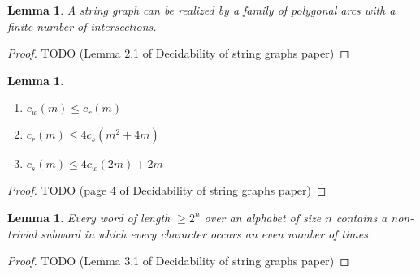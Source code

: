 \documentclass[12pt]{article}
\theoremstyle{plain} %
\newtheorem{lemma}[theorem]{Lemma}
\begin{document}
\begin{lemma}
A string graph can be realized by a family of polygonal arcs with a finite number of intersections.
\end{lemma}

\begin{proof}
TODO (Lemma 2.1 of Decidability of string graphs paper)
\end{proof}

\begin{lemma}
\begin{enumerate}
    \item \(c_w(m) \leq c_r(m)\)
    \item \( c_r(m) \leq 4 c_s(m^2 + 4m) \)
    \item \(c_s(m) \leq 4 c_w(2m) + 2m\)
\end{enumerate}
\end{lemma}

\begin{proof}
    TODO (page 4 of Decidability of string graphs paper)
\end{proof}

\begin{lemma}
    Every word of length \(\geq 2^n\) over an alphabet of size \(n\) contains a non-trivial subword in which every character occurs an even number of times.
\end{lemma}

\begin{proof}
TODO (Lemma 3.1 of Decidability of string graphs paper)
\end{proof}
\end{document}
